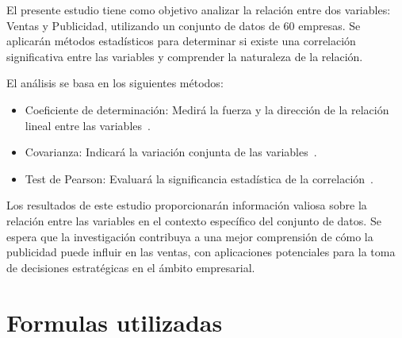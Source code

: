 \documentclass[conference]{IEEEtran}
\begin{document}
El presente estudio tiene como objetivo analizar la relación entre dos
variables: Ventas y Publicidad, utilizando un conjunto de datos de 60 empresas.
Se aplicarán métodos estadísticos para determinar si existe una correlación
significativa entre las variables y comprender la naturaleza de la relación.

El análisis se basa en los siguientes métodos:

\begin{itemize}
	\item Coeficiente de determinación: Medirá la fuerza y la dirección de la
	      relación lineal entre las
	      variables~\cite{coeficiente_determinacion}.

	\item Covarianza: Indicará la variación conjunta de las
	      variables~\cite{covarianza}.

	\item Test de Pearson: Evaluará la significancia estadística de
	      la correlación~\cite{test_pearson}.
\end{itemize}

Los resultados de este estudio proporcionarán información valiosa sobre la
relación entre las variables en el contexto específico del conjunto de datos.
Se espera que la investigación contribuya a una mejor comprensión de cómo la
publicidad puede influir en las ventas, con aplicaciones potenciales para la
toma de decisiones estratégicas en el ámbito empresarial.

\section{Formulas utilizadas}
\end{document}
